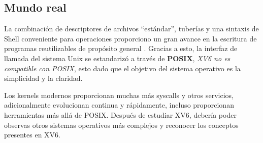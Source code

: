 \documentclass{libs/ufc_format}
\begin{document}
\subsection{Mundo real}
\begin{frame}{}
  La combinación de descriptores de archivos “estándar”, tuberías y una sintaxis de Shell conveniente para operaciones proporciono un gran avance en la escritura de programas reutilizables de propósito general \cite{xv6_book}. Gracias a esto, la interfaz de llamada del sistema Unix se estandarizó a través de \textbf{POSIX}, \emph{XV6 no es compatible con POSIX}, esto dado que el objetivo del sistema operativo es la simplicidad y la claridad.

  \vspace{0.4cm}

  Los kernels modernos proporcionan muchas más syscalls y otros servicios, adicionalmente evolucionan continua y rápidamente, incluso proporcionan herramientas más allá de POSIX. Después de estudiar XV6, debería poder observas otros sistemas operativos más complejos y reconocer los conceptos presentes en XV6.
\end{frame}

\end{document}
